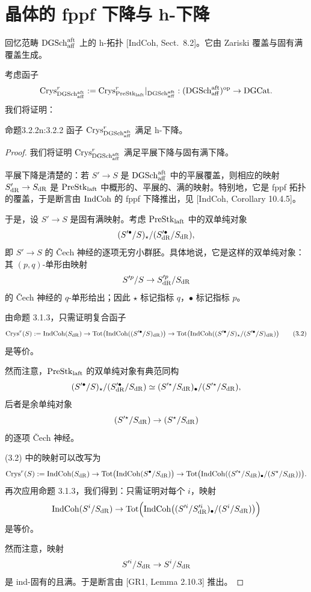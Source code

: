 \section{晶体的 fppf 下降与 h-下降}

回忆范畴 $\mathrm{DGSch}_{\mathrm{aff}}^{\mathrm{aft}}$ 上的 h-拓扑 [IndCoh, Sect.~8.2]。它由 Zariski 覆盖与固有满覆盖生成。

考虑函子
\[
\mathrm{Crys}^r_{\mathrm{DGSch}_{\mathrm{aff}}^{\mathrm{aft}}}:=\mathrm{Crys}^r_{\mathrm{PreStk}_{\mathrm{laft}}}|_{\mathrm{DGSch}_{\mathrm{aff}}^{\mathrm{aft}}}:(\mathrm{DGSch}_{\mathrm{aff}}^{\mathrm{aft}})^{\mathrm{op}}\to\mathrm{DGCat}.
\]
我们将证明：

\begin{othm}{命题}{3.2.2}{n:3.2.2}
函子 $\mathrm{Crys}^r_{\mathrm{DGSch}_{\mathrm{aff}}^{\mathrm{aft}}}$ 满足 h-下降。
\end{othm}

\begin{proof}
我们将证明 $\mathrm{Crys}^r_{\mathrm{DGSch}_{\mathrm{aff}}^{\mathrm{aft}}}$ 满足平展下降与固有满下降。

平展下降是清楚的：若 $S'\to S$ 是 $\mathrm{DGSch}_{\mathrm{aff}}^{\mathrm{aft}}$ 中的平展覆盖，则相应的映射 $S'_{\mathrm{dR}}\to S_{\mathrm{dR}}$ 是 $\mathrm{PreStk}_{\mathrm{laft}}$ 中概形的、平展的、满的映射。特别地，它是 fppf 拓扑的覆盖，于是断言由 $\mathrm{IndCoh}$ 的 fppf 下降推出，见 [IndCoh, Corollary 10.4.5]。

于是，设 $S'\to S$ 是固有满映射。考虑 $\mathrm{PreStk}_{\mathrm{laft}}$ 中的双单纯对象
\[
(S'^\bullet/S)_\star/(S'^{\bullet}_{\mathrm{dR}}/S_{\mathrm{dR}}),
\]
即 $S'\to S$ 的 Čech 神经的逐项无穷小群胚。具体地说，它是这样的双单纯对象：其 $(p,q)$-单形由映射
\[
S'^p/S\to S'^p_{\mathrm{dR}}/S_{\mathrm{dR}}
\]
的 Čech 神经的 $q$-单形给出；因此 $\star$ 标记指标 $q$，$\bullet$ 标记指标 $p$。

由命题 3.1.3，只需证明复合函子
\begin{equation}
\mathrm{Crys}^r(S):=\mathrm{IndCoh}(S_{\mathrm{dR}})\to\mathrm{Tot}\big(\mathrm{IndCoh}((S'^\bullet/S)_{\mathrm{dR}})\big)\to
\mathrm{Tot}\big(\mathrm{IndCoh}((S'^\bullet/S)_\star/(S'^\bullet/S)_{\mathrm{dR}})\big)\tag{3.2}
\end{equation}
是等价。

然而注意，$\mathrm{PreStk}_{\mathrm{laft}}$ 的双单纯对象有典范同构
\[
(S'^\bullet/S)_\star/(S'^{\bullet}_{\mathrm{dR}}/S_{\mathrm{dR}})\simeq(S'^\star/S_{\mathrm{dR}})_\bullet/(S'^\star/S_{\mathrm{dR}}),
\]
后者是余单纯对象
\[
(S'^\star/S_{\mathrm{dR}})\to(S^\star/S_{\mathrm{dR}})
\]
的逐项 Čech 神经。

(3.2) 中的映射可以改写为
\[
\mathrm{Crys}^r(S):=\mathrm{IndCoh}(S_{\mathrm{dR}})\to\mathrm{Tot}\big(\mathrm{IndCoh}(S^\bullet/S_{\mathrm{dR}})\big)\to\mathrm{Tot}\big(\mathrm{IndCoh}((S'^\star/S_{\mathrm{dR}})_\bullet/(S^\star/S_{\mathrm{dR}}))\big).
\]
再次应用命题 3.1.3，我们得到：只需证明对每个 $i$，映射
\[
\mathrm{IndCoh}(S^i/S_{\mathrm{dR}})\to\mathrm{Tot}\Big(\mathrm{IndCoh}\big((S'^i/S'^i_{\mathrm{dR}})_\bullet/(S^i/S_{\mathrm{dR}})\big)\Big)
\]
是等价。

然而注意，映射
\[
S'^i/S_{\mathrm{dR}}\to S^i/S_{\mathrm{dR}}
\]
是 ind-固有的且满。于是断言由 [GR1, Lemma 2.10.3] 推出。
\end{proof}

